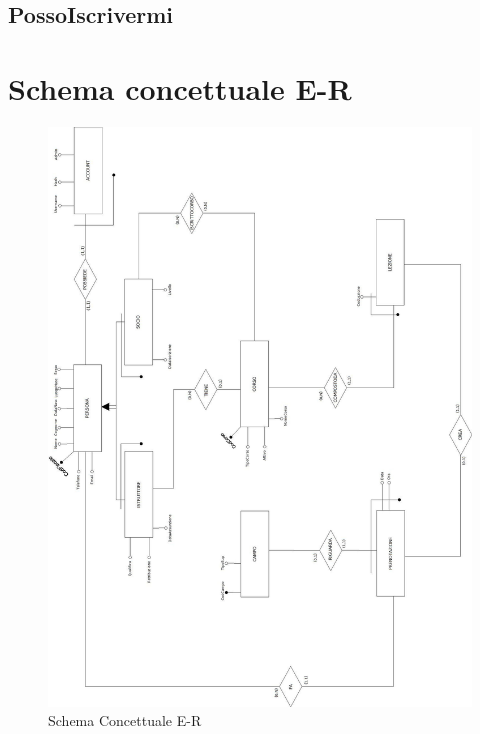 

\subsection{PossoIscrivermi}



\section{Schema concettuale E-R}
\begin{figure}[H]
 \centering
  \includegraphics[width=\textwidth, height=\textheight]{Images/ER_FINALE.jpg}
\caption{Schema Concettuale E-R}
\end{figure}